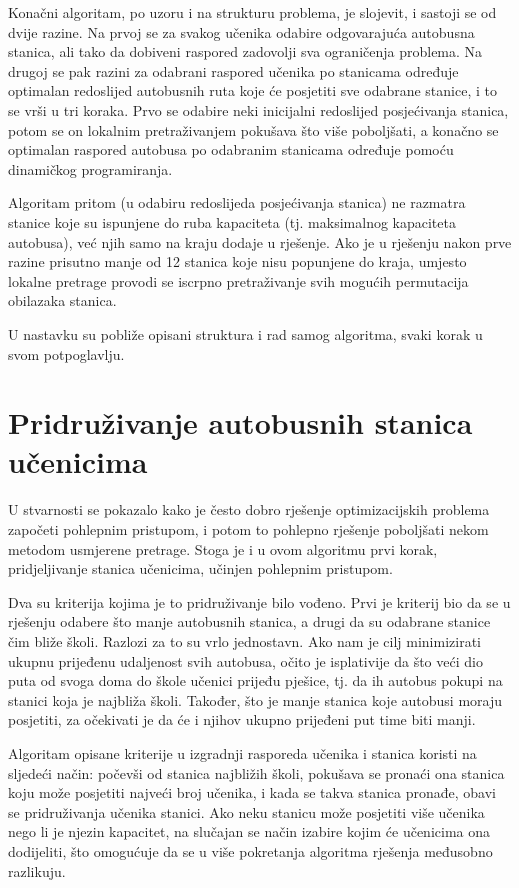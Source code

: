 \documentclass[times, utf8, seminar, numeric]{fer}
\begin{document}
Konačni algoritam, po uzoru i na strukturu problema, je slojevit, i sastoji se od dvije razine. Na prvoj se za svakog učenika odabire odgovarajuća autobusna stanica, ali tako da dobiveni raspored zadovolji sva ograničenja problema. Na drugoj se pak razini za odabrani raspored učenika po stanicama određuje optimalan redoslijed autobusnih ruta koje će posjetiti sve odabrane stanice, i to se vrši u tri koraka. Prvo se odabire neki inicijalni redoslijed posjećivanja stanica, potom se on lokalnim pretraživanjem pokušava što više poboljšati, a konačno se optimalan raspored autobusa po odabranim stanicama određuje pomoću dinamičkog programiranja.

Algoritam pritom (u odabiru redoslijeda posjećivanja stanica) ne razmatra stanice koje su ispunjene do ruba kapaciteta (tj. maksimalnog kapaciteta autobusa), već njih samo na kraju dodaje u rješenje. Ako je u rješenju nakon prve razine prisutno manje od 12 stanica koje nisu popunjene do kraja, umjesto lokalne pretrage provodi se iscrpno pretraživanje svih mogućih permutacija obilazaka stanica.

U nastavku su pobliže opisani struktura i rad samog algoritma, svaki korak u svom potpoglavlju.

\section{Pridruživanje autobusnih stanica učenicima}
U stvarnosti se pokazalo kako je često dobro rješenje optimizacijskih problema započeti pohlepnim pristupom, i potom to pohlepno rješenje poboljšati nekom metodom usmjerene pretrage. Stoga je i u ovom algoritmu prvi korak, pridjeljivanje stanica učenicima, učinjen pohlepnim pristupom.

Dva su kriterija kojima je to pridruživanje bilo vođeno. Prvi je kriterij bio da se u rješenju odabere što manje autobusnih stanica, a drugi da su odabrane stanice čim bliže školi. Razlozi za to su vrlo jednostavn. Ako nam je cilj minimizirati ukupnu prijeđenu udaljenost svih autobusa, očito je isplativije da što veći dio puta od svoga doma do škole učenici prijeđu pješice, tj. da ih autobus pokupi na stanici koja je najbliža školi. Također, što je manje stanica koje autobusi moraju posjetiti, za očekivati je da će i njihov ukupno prijeđeni put time biti manji.

Algoritam opisane kriterije u izgradnji rasporeda učenika i stanica koristi na sljedeći način: počevši od stanica najbližih školi, pokušava se pronaći ona stanica koju može posjetiti najveći broj učenika, i kada se takva stanica pronađe, obavi se pridruživanja učenika stanici. Ako neku stanicu može posjetiti više učenika nego li je njezin kapacitet, na slučajan se način izabire kojim će učenicima ona dodijeliti, što omogućuje da se u više pokretanja algoritma rješenja međusobno razlikuju.
\end{document}
